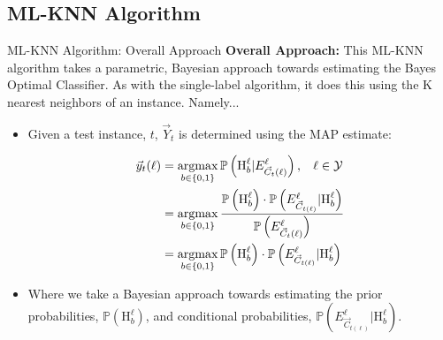 \documentclass{beamer}
\DeclareMathOperator*{\argmax}{argmax} %
\begin{document}
\subsection{ML-KNN Algorithm}
\begin{frame}[t]{ML-KNN Algorithm: Overall Approach}
\small
\textbf{Overall Approach:}
This ML-KNN algorithm takes a parametric, Bayesian approach towards estimating the Bayes Optimal Classifier. As with the single-label algorithm, it does this using the K nearest neighbors of an instance. Namely...

\begin{itemize}
	
		\item 
		Given a test instance, $t$, $\vec{Y}_t$ is determined using the MAP estimate:
	
	
		\begin{align*}
		\vec{y}_t(\ell) &= \argmax_{b \in \{0, 1\}} \mathbb{P}\left(\textrm{H}_b^\ell | E_{\vec{C}_t(\ell)}^\ell\right), \textrm{\hspace{0.3cm}}\ell \in \mathcal{Y} \\
		&= \argmax_{b \in \{0,1\}} \frac{\mathbb{P}\left(\textrm{H}_b^\ell\right) \cdot \mathbb{P}\left(E_{\vec{C}_{t(\ell)}}^\ell | \textrm{H}_b^\ell\right)}{\mathbb{P}\left(E_{\vec{C}_t(\ell)}^\ell \right)} \\
		&= \argmax_{b \in \{0, 1\}}\mathbb{P}\left(\textrm{H}_b^\ell\right) \cdot \mathbb{P}\left(E_{\vec{C}_{t(\ell)}}^\ell | \textrm{H}_b^\ell\right)
		\end{align*}
	
	
		\item
		Where we take a Bayesian approach towards estimating the prior probabilities, $\mathbb{P}\left(\textrm{H}_b^\ell\right)$, and conditional probabilities, $\mathbb{P}\left(E_{\vec{C}_{t(\ell)}}^\ell | \textrm{H}_b^\ell\right)$.
	\normalsize
\end{itemize}
\end{frame}
\end{document}
